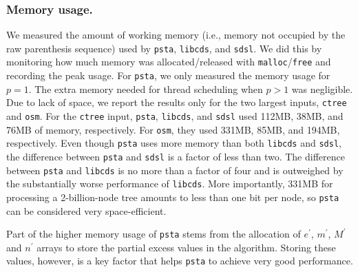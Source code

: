 \subsubsection{Memory usage.}
We measured the amount of working memory (i.e., memory not occupied by the raw
parenthesis sequence) used by {\tt psta}, {\tt libcds}, and {\tt sdsl}.
We did this by monitoring how much memory was allocated/released with
\texttt{malloc}/\texttt{free} and recording the peak usage.
For {\tt psta}, we only measured the memory usage for $p = 1$.
The extra memory needed for thread scheduling when $p > 1$ was negligible.
Due to lack of space, we report the results only for the two largest inputs,
{\tt ctree} and {\tt osm}.
For the {\tt ctree} input, {\tt psta}, {\tt libcds}, and {\tt sdsl} used 112MB,
38MB, and 76MB of memory, respectively.
For {\tt osm}, they used 331MB, 85MB, and 194MB, respectively.
Even though {\tt psta} uses more memory than both {\tt libcds} and {\tt sdsl},
the difference between {\tt psta} and {\tt sdsl} is a factor of less than two.
The difference between {\tt psta} and {\tt libcds} is no more than a factor of
four and is outweighed by the substantially worse performance of {\tt libcds}.
More importantly, 331MB for processing a 2-billion-node tree amounts to less
than one bit per node, so {\tt psta} can be considered very space-efficient.

Part of the higher memory usage of {\tt psta} stems from the allocation of
$e^{\prime}$, $m^{\prime}$, $M^{\prime}$ and $n^{\prime}$ arrays to store the
partial excess values in the algorithm.
Storing these values, however, is a key factor that helps {\tt psta} to achieve
very good performance.
